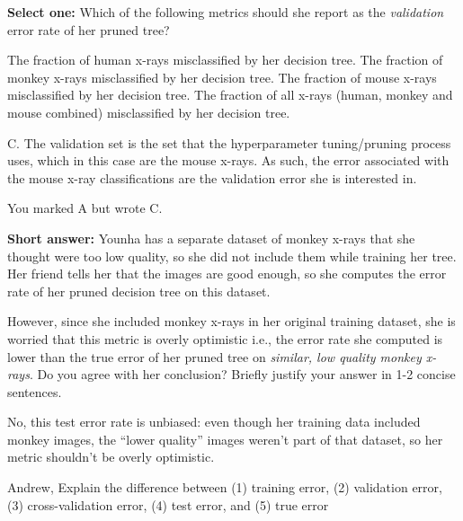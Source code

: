\begin{parts}
    \begin{subparts}
        \subpart[2] \textbf{Select one:} Which of the following metrics should she report as the \emph{validation} error rate of her pruned tree?
        \begin{checkboxes}
            \choice The fraction of human x-rays misclassified by her decision tree.
            \choice The fraction of monkey x-rays misclassified by her decision tree.
            \choice The fraction of mouse x-rays misclassified by her decision tree.
            \choice The fraction of all x-rays (human, monkey and mouse combined) misclassified by her decision tree.
        \end{checkboxes}
        \begin{soln}
            C. The validation set is the set that the hyperparameter tuning/pruning process uses, which in this case are the mouse x-rays. As such, the error associated with the mouse x-ray classifications are the validation error she is interested in.
        \end{soln}
        \begin{qtester}
            You marked A but wrote C. 
        \end{qtester}
            
        \subpart[3] \textbf{Short answer:} Younha has a separate dataset of monkey x-rays that she thought were too low quality, so she did not include them while training her tree. Her friend tells her that the images are good enough, so she computes the error rate of her pruned decision tree on this dataset. 
        
        However, since she included monkey x-rays in her original training dataset, she is worried that this metric is overly optimistic i.e., the error rate she computed is lower than the true error of her pruned tree on \emph{similar, low quality monkey x-rays}. Do you agree with her conclusion? Briefly justify your answer in 1-2 concise sentences.
        \fillwithlines{9em}
        \begin{soln}
            No, this test error rate is unbiased: even though her training data included monkey images, the ``lower quality'' images weren't part of that dataset, so her metric shouldn't be overly optimistic.
        \end{soln}   
    \end{subparts}
    \begin{qauthor}
        Andrew, Explain the difference between (1) training error, (2) validation error, (3) cross-validation error, (4) test error, and (5) true error


\end{qauthor}
\end{parts}
